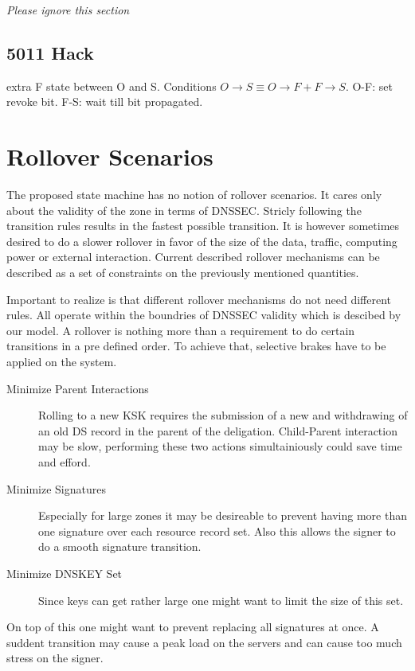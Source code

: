 \documentclass[twoside, a4paper]{article}
\begin{document}
\emph{Please ignore this section}
\subsection{5011 Hack}

extra F state between O and S. Conditions $O\rightarrow S \equiv O\rightarrow F + F\rightarrow S$.
O-F: set revoke bit. F-S: wait till bit propagated. 

\section{Rollover Scenarios}

The proposed state machine has no notion of rollover scenarios. It cares
only about the validity of the zone in terms of DNSSEC. Stricly following
the transition rules results in the fastest possible transition. It is
however sometimes desired to do a slower rollover in favor of the size 
of the data, traffic, computing power or external interaction. Current
described rollover mechanisms can be described as a set of constraints
on the previously mentioned quantities.

Important to realize is that different rollover mechanisms do not need
different rules. All operate within the boundries of DNSSEC validity
which is descibed by our model. A rollover is nothing more than a
requirement to do certain transitions in a pre defined order. To achieve
that, selective brakes have to be applied on the system.

\begin{description}
\item [Minimize Parent Interactions]
	Rolling to a new KSK requires the
	submission of a new and withdrawing of an old DS record in the parent of
	the deligation. Child-Parent interaction may be slow, performing
	these two actions simultainiously could save time and efford.
\item [Minimize Signatures]
	Especially for large zones it may be 
	desireable to prevent having more than one signature over each 
	resource record set. Also this allows the signer to do a smooth
	signature transition.
\item [Minimize DNSKEY Set] Since keys can get rather large one might
	want to limit the size of this set.
\end{description}

On top of this one might want to prevent replacing all signatures at 
once. A suddent transition may cause a peak load on the servers and can
cause too much stress on the signer. 
\end{document}

